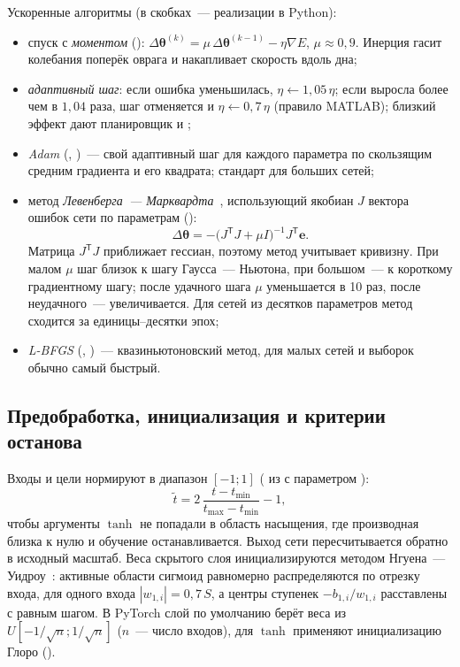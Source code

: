 Ускоренные алгоритмы (в скобках~--- реализации в Python):
\begin{itemize}
\item спуск с \emph{моментом} ():
$\Delta\boldsymbol\theta^{(k)} = \mu\,\Delta\boldsymbol\theta^{(k-1)} - \eta\nabla E$, $\mu \approx 0,9$. Инерция
гасит колебания поперёк оврага и накапливает скорость вдоль дна;
\item \emph{адаптивный шаг}: если ошибка уменьшилась, $\eta \leftarrow 1,05\,\eta$; если выросла более чем в
$1,04$ раза, шаг отменяется и $\eta \leftarrow 0,7\,\eta$ (правило  MATLAB); близкий эффект
дают планировщик  и 
;
\item \emph{Adam} (, )~--- свой адаптивный шаг
для каждого параметра по скользящим средним градиента и его квадрата; стандарт для больших сетей;
\item метод \emph{Левенберга~--- Марквардта}~\cite{marquardt1963}, использующий якобиан $J$ вектора ошибок
сети по параметрам ():
\begin{equation}
\label{eq:lm}
\Delta\boldsymbol\theta = -\bigl(J^{\mathsf T}J + \mu I\bigr)^{-1} J^{\mathsf T}\mathbf{e}.
\end{equation}
Матрица $J^{\mathsf T}J$ приближает гессиан, поэтому метод учитывает кривизну. При малом $\mu$ шаг
близок к шагу Гаусса~--- Ньютона, при большом~--- к короткому градиентному шагу; после удачного шага
$\mu$ уменьшается в 10 раз, после неудачного~--- увеличивается. Для сетей из десятков параметров метод
сходится за единицы--десятки эпох;
\item \emph{L-BFGS} (, )~--- квазиньютоновский
метод, для малых сетей и выборок обычно самый быстрый.
\end{itemize}

\subsection{Предобработка, инициализация и критерии останова}

Входы и цели нормируют в диапазон $[-1; 1]$ ( из  с
параметром ):
\begin{equation}
\tilde t = 2\,\frac{t - t_{\min}}{t_{\max} - t_{\min}} - 1 ,
\end{equation}
чтобы аргументы $\tanh$ не попадали в область насыщения, где производная близка к нулю и обучение
останавливается. Выход сети пересчитывается обратно в исходный масштаб. Веса скрытого слоя
инициализируются методом Нгуена~--- Уидроу~\cite{nguyen1990}: активные области сигмоид равномерно
распределяются по отрезку входа, для одного входа $|w_{1,i}| = 0,7\,S$, а центры ступенек
$-b_{1,i}/w_{1,i}$ расставлены с равным шагом. В PyTorch слой  по умолчанию берёт веса из
$U[-1/\sqrt{n}; 1/\sqrt{n}]$ ($n$~--- число входов), для $\tanh$ применяют инициализацию Глоро
().

